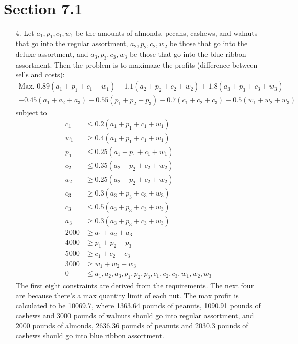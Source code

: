 \documentclass[10pt]{report}
\title{
	\courseTitle\\
	\hwNo\\
	\hwDate
}
\author{\hwAuther}
\date{}
\begin{document}
\maketitle

\section*{Section 7.1}
\begin{enumerate}
	\item [4.]
	Let $a_1, p_1, c_1, w_1$ be the amounts of almonds, pecans, cashews, and walnuts that go into the regular assortment, $a_2, p_2, c_2, w_2$ be those that go into the deluxe assortment, and $a_3, p_3, c_3, w_3$ be those that go into the blue ribbon assortment. Then the problem is to maximaze the profits (difference between sells and costs):
	\begin{multline*}
		\text{Max. } 0.89 (a_1 + p_1 + c_1 + w_1) + 1.1 (a_2 + p_2 + c_2 + w_2) + 
		1.8 (a_3 + p_3 + c_3 + w_3) \\ - 0.45 (a_1 + a_2 + a_3) - 0.55 (p_1 + p_2 + p_3) - 0.7 (c_1 + c_2 + c_3) - 0.5 (w_1 + w_2 + w_3)
	\end{multline*}
	subject to
	\begin{align*}
		c_1 &\le 0.2 (a_1 + p_1 + c_1 + w_1) \\
		w_1 &\ge 0.4 (a_1 + p_1 + c_1 + w_1) \\
		p_1 &\le 0.25 (a_1 + p_1 + c_1 + w_1) \\
		c_2 &\le 0.35 (a_2 + p_2 + c_2 + w_2) \\
		a_2 &\ge 0.25 (a_2 + p_2 + c_2 + w_2) \\
		c_3 &\ge 0.3 (a_3 + p_3 + c_3 + w_3) \\
		c_3 &\le 0.5 (a_3 + p_3 + c_3 + w_3) \\
		a_3 &\ge 0.3 (a_3 + p_3 + c_3 + w_3) \\
		2000 &\ge a_1 + a_2 + a_3 \\
		4000 &\ge p_1 + p_2 + p_3 \\
		5000 &\ge c_1 + c_2 + c_3 \\
		3000 &\ge w_1 + w_2 + w_3 \\
		0 &\le a_1, a_2, a_3, p_1, p_2, p_3, c_1, c_2, c_3, w_1, w_2, w_3
	\end{align*}
	The first eight constraints are derived from the requirements. The next four are because there's a max quantity limit of each nut. The max profit is calculated to be 10069.7, where 1363.64 pounds of peanuts, 1090.91 pounds of cashews and 3000 pounds of walnuts should go into regular assortment, and 2000 pounds of almonds, 2636.36 pounds of peanuts and 2030.3 pounds of cashews should go into blue ribbon assortment.
\end{enumerate}
\end{document}
